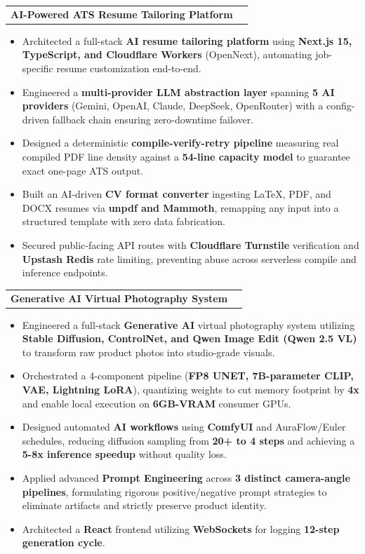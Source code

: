 \documentclass[letterpaper,11pt]{article}
\newcommand{\resumeItem}[1]{
  \item\small{
    {#1 \vspace{-4pt}}
  }
}
\newcommand{\resumeProjectHeading}[2]{
    \item
    \begin{tabularx}{0.97\textwidth}{X r}
      \textbf{#1} & #2 \\
    \end{tabularx}\vspace{-5pt}
}
\newcommand{\resumeItemListStart}{\begin{itemize}}
\newcommand{\resumeItemListEnd}{\end{itemize}\vspace{-5pt}}
\begin{document}
      \resumeProjectHeading
          {\textbf{AI-Powered ATS Resume Tailoring Platform} }{}
          \resumeItemListStart
            \resumeItem{Architected a full-stack \textbf{AI resume tailoring platform} using \textbf{Next.js 15, TypeScript, and Cloudflare Workers} (OpenNext), automating job-specific resume customization end-to-end.}
            \resumeItem{Engineered a \textbf{multi-provider LLM abstraction layer} spanning \textbf{5 AI providers} (Gemini, OpenAI, Claude, DeepSeek, OpenRouter) with a config-driven fallback chain ensuring zero-downtime failover.}
            \resumeItem{Designed a deterministic \textbf{compile-verify-retry pipeline} measuring real compiled PDF line density against a \textbf{54-line capacity model} to guarantee exact one-page ATS output.}
            \resumeItem{Built an AI-driven \textbf{CV format converter} ingesting LaTeX, PDF, and DOCX resumes via \textbf{unpdf and Mammoth}, remapping any input into a structured template with zero data fabrication.}
            \resumeItem{Secured public-facing API routes with \textbf{Cloudflare Turnstile} verification and \textbf{Upstash Redis} rate limiting, preventing abuse across serverless compile and inference endpoints.}
          \resumeItemListEnd

      \resumeProjectHeading
          {\textbf{Generative AI Virtual Photography System} }{}
          \resumeItemListStart
            \resumeItem{Engineered a full-stack \textbf{Generative AI} virtual photography system utilizing \textbf{Stable Diffusion, ControlNet, and Qwen Image Edit (Qwen 2.5 VL)} to transform raw product photos into studio-grade visuals.}
            \resumeItem{Orchestrated a 4-component pipeline (\textbf{FP8 UNET, 7B-parameter CLIP, VAE, Lightning LoRA}), quantizing weights to cut memory footprint by \textbf{4x} and enable local execution on \textbf{6GB-VRAM} consumer GPUs.}
            \resumeItem{Designed automated \textbf{AI workflows} using \textbf{ComfyUI} and AuraFlow/Euler schedules, reducing diffusion sampling from \textbf{20+ to 4 steps} and achieving a \textbf{5-8x inference speedup} without quality loss.}
            \resumeItem{Applied advanced \textbf{Prompt Engineering} across \textbf{3 distinct camera-angle pipelines}, formulating rigorous positive/negative prompt strategies to eliminate artifacts and strictly preserve product identity.}
            \resumeItem{Architected a \textbf{React} frontend utilizing \textbf{WebSockets} for logging \textbf{12-step generation cycle}.}
          \resumeItemListEnd
\end{document}

